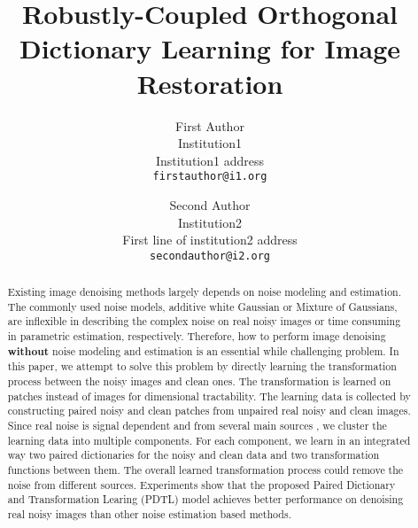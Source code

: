 \documentclass[10pt,twocolumn,letterpaper]{article}
\begin{document}
\title{Robustly-Coupled Orthogonal Dictionary Learning for Image Restoration}

\author{First Author\\
Institution1\\
Institution1 address\\
{\tt\small firstauthor@i1.org}
\and
Second Author\\
Institution2\\
First line of institution2 address\\
{\tt\small secondauthor@i2.org}
}

\maketitle

\begin{abstract}
Existing image denoising methods largely depends on noise modeling and estimation. The commonly used noise models, additive white Gaussian or Mixture of Gaussians, are inflexible in describing the complex noise on real noisy images or time consuming in parametric estimation, respectively. Therefore, how to perform image denoising \textbf{without} noise modeling and estimation is an essential while challenging problem. In this paper, we attempt to solve this problem by directly learning the transformation process between the noisy images and clean ones. The transformation is learned on patches instead of images for dimensional tractability. The learning data is collected by constructing paired noisy and clean patches from unpaired real noisy and clean images. Since real noise is signal dependent and from several main sources \cite{healey1994radiometric}, we cluster the learning data into multiple components. For each component, we learn in an integrated way two paired dictionaries for the noisy and clean data and two transformation functions between them. The overall learned transformation process could remove the noise from different sources. Experiments show that the proposed Paired Dictionary and Transformation Learing (PDTL) model achieves better performance on denoising real noisy images than other noise estimation based methods.
\end{abstract}
\end{document}
